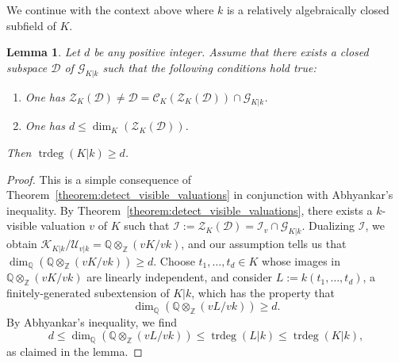 \documentclass[12pt]{amsart}
\newcommand{\Zbb}{\mathbb{Z}}
\newcommand{\Qbb}{\mathbb{Q}}
\newcommand{\trdeg}{\operatorname{trdeg}}
\newcommand{\Zcal}{\mathcal{Z}}
\newcommand{\Ccal}{\mathcal{C}}
\newcommand{\Gcal}{\mathcal{G}}
\newcommand{\Dcal}{\mathcal{D}}
\newcommand{\Ical}{\mathcal{I}}
\newcommand{\Ucal}{\mathcal{U}}
\newcommand{\Kcal}{\mathcal{K}}
\newtheorem{lemma}[theorem]{Lemma}
\theoremstyle{definition}
\begin{document}
We continue with the context above where $k$ is a relatively algebraically closed subfield of $K$.
\begin{lemma}\label{lemma:trdeg_geq_of_exists_subspace}
  Let $d$ be any positive integer.
  Assume that there exists a closed subspace $\Dcal$ of $\Gcal_{K|k}$ such that the following conditions hold true:
  \begin{enumerate}
    \item One has $\Zcal_{K}(\Dcal) \neq \Dcal = \Ccal_{K}(\Zcal_{K}(\Dcal)) \cap \Gcal_{K|k}$.
    \item One has $d \le \dim_{K}(\Zcal_{K}(\Dcal))$.
  \end{enumerate}
  Then $\trdeg(K|k) \geq d$.
\end{lemma}
\begin{proof}
  This is a simple consequence of Theorem~\ref{theorem:detect_visible_valuations} in conjunction with Abhyankar's inequality.
  By Theorem~\ref{theorem:detect_visible_valuations}, there exists a $k$-visible valuation $v$ of $K$ such that $\Ical := \Zcal_{K}(\Dcal) = \Ical_{v} \cap \Gcal_{K|k}$.
  Dualizing $\Ical$, we obtain $\Kcal_{K|k}/\Ucal_{v|k} = \Qbb \otimes_{\Zbb} (vK/vk)$, and our assumption tells us that $\dim_{\Qbb}(\Qbb \otimes_{\Zbb}(vK/vk)) \geq d$.
  Choose $t_{1},\ldots,t_{d} \in K$ whose images in $\Qbb \otimes_{\Zbb}(vK/vk)$ are linearly independent, and consider $L := k(t_{1},\ldots,t_{d})$, a finitely-generated subextension of $K|k$, which has the property that
  \[ \dim_{\Qbb}(\Qbb \otimes_{\Zbb} (vL/vk)) \geq d. \]
  By Abhyankar's inequality, we find
  \[ d \le \dim_{\Qbb}(\Qbb \otimes_{\Zbb} (vL/vk)) \le \trdeg(L|k) \le \trdeg(K|k), \]
  as claimed in the lemma.
\end{proof}
\end{document}
